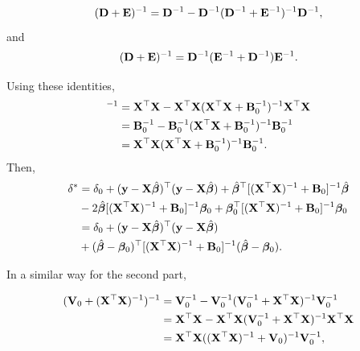 \begin{enumerate}[leftmargin=*]
\begin{equation*}
	({\bf{D}} + {\bf{E}})^{-1} = {\bf{D}}^{-1} - {\bf{D}}^{-1}({\bf{D}}^{-1} + {\bf{E}}^{-1})^{-1}{\bf{D}}^{-1},
\end{equation*}
and
\begin{equation*}
	({\bf{D}} + {\bf{E}})^{-1} = {\bf{D}}^{-1}({\bf{E}}^{-1} + {\bf{D}}^{-1}){\bf{E}}^{-1}.
\end{equation*}

Using these identities,
\begin{align*}
	[({\bf{X}}^{\top}{\bf{X}})^{-1} + {\bf{B}}_0]^{-1} & = {\bf{X}}^{\top}{\bf{X}} - {\bf{X}}^{\top}{\bf{X}}({\bf{X}}^{\top}{\bf{X}} + {\bf{B}}_0^{-1})^{-1}{\bf{X}}^{\top}{\bf{X}} \\
	& = {\bf{B}}_0^{-1} - {\bf{B}}_0^{-1}({\bf{X}}^{\top}{\bf{X}} + {\bf{B}}_0^{-1})^{-1}{\bf{B}}_0^{-1}\\
	& = {\bf{X}}^{\top}{\bf{X}}({\bf{X}}^{\top}{\bf{X}} + {\bf{B}}_0^{-1})^{-1}{\bf{B}}_0^{-1}. 
\end{align*}
Then, 
\begin{align*}
	\delta^* & = \delta_0+ ({\bf{y}} - {\bf{X}}\hat{\bm{\beta}})^{\top}({\bf{y}} - {\bf{X}}\hat{\bm{\beta}}) + \hat{\bm{\beta}}^{\top}[({\bf{X}}^{\top}{\bf{X}})^{-1} + {\bf{B}}_0]^{-1}\hat{\bm{\beta}} \\
	& - 2\hat{\bm{\beta}}[({\bf{X}}^{\top}{\bf{X}})^{-1} + {\bf{B}}_0]^{-1}\bm{\beta}_0 + \bm{\beta}_0^{\top}[({\bf{X}}^{\top}{\bf{X}})^{-1} + {\bf{B}}_0]^{-1}\bm{\beta}_0\\
	& = \delta_0+ ({\bf{y}} - {\bf{X}}\hat{\bm{\beta}})^{\top}({\bf{y}} - {\bf{X}}\hat{\bm{\beta}})\\
	& + (\hat{\bm{\beta}} - \bm{\beta}_0)^{\top}[({\bf{X}}^{\top}{\bf{X}})^{-1} + {\bf{B}}_0]^{-1}(\hat{\bm{\beta}} - \bm{\beta}_0).
\end{align*}

In a similar way for the second part,

\begin{align*}
	({\bf{V}}_0+({\bf{X}}^{\top}{\bf{X}})^{-1})^{-1}&={\bf{V}}_0^{-1}-{\bf{V}}_0^{-1}({\bf{V}}_0^{-1}+{\bf{X}}^{\top}{\bf{X}})^{-1}{\bf{V}}_0^{-1}\\
	&={\bf{X}}^{\top}{\bf{X}}-{\bf{X}}^{\top}{\bf{X}}({\bf{V}}_0^{-1}+{\bf{X}}^{\top}{\bf{X}})^{-1}{\bf{X}}^{\top}{\bf{X}}\\
	&={\bf{X}}^{\top}{\bf{X}}(({\bf{X}}^{\top}{\bf{X}})^{-1}+{\bf{V}}_0)^{-1}{\bf{V}}_0^{-1},
\end{align*}


\end{enumerate}
